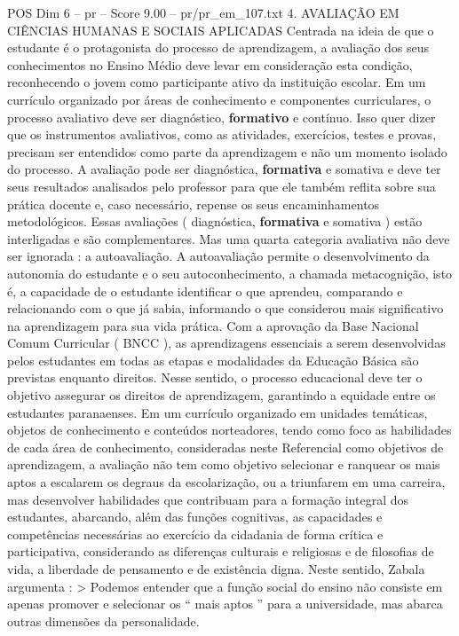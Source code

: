 \begin{textsample}{POS Dim 6 – pr – Score 9.00 – pr/pr\_em\_107.txt}  \label{ex:f6_pos_025}
4.
AVALIAÇÃO EM CIÊNCIAS HUMANAS E SOCIAIS APLICADAS Centrada na ideia de que o estudante é o protagonista do processo de aprendizagem, a avaliação dos seus conhecimentos no Ensino Médio deve levar em consideração esta condição, reconhecendo o jovem como participante ativo da instituição escolar.
Em um currículo organizado por áreas de conhecimento e componentes curriculares, o processo avaliativo deve ser diagnóstico, \textbf{formativo} e contínuo.
Isso quer dizer que os instrumentos avaliativos, como as atividades, exercícios, testes e provas, precisam ser entendidos como parte da aprendizagem e não um momento isolado do processo.
A avaliação pode ser diagnóstica, \textbf{formativa} e somativa e deve ter seus resultados analisados pelo professor para que ele também reflita sobre sua prática docente e, caso necessário, repense os seus encaminhamentos metodológicos.
Essas avaliações ( diagnóstica, \textbf{formativa} e somativa ) estão interligadas e são complementares.
Mas uma quarta categoria avaliativa não deve ser ignorada : a autoavaliação.
A autoavaliação permite o desenvolvimento da autonomia do estudante e o seu autoconhecimento, a chamada metacognição, isto é, a capacidade de o estudante identificar o que aprendeu, comparando e relacionando com o que já sabia, informando o que considerou mais significativo na aprendizagem para sua vida prática.
Com a aprovação da Base Nacional Comum Curricular ( BNCC ), as aprendizagens essenciais a serem desenvolvidas pelos estudantes em todas as etapas e modalidades da Educação Básica são previstas enquanto direitos.
Nesse sentido, o processo educacional deve ter o objetivo assegurar os direitos de aprendizagem, garantindo a equidade entre os estudantes paranaenses.
Em um currículo organizado em unidades temáticas, objetos de conhecimento e conteúdos norteadores, tendo como foco as habilidades de cada área de conhecimento, consideradas neste Referencial como objetivos de aprendizagem, a avaliação não tem como objetivo selecionar e ranquear os mais aptos a escalarem os degraus da escolarização, ou a triunfarem em uma carreira, mas desenvolver habilidades que contribuam para a formação integral dos estudantes, abarcando, além das funções cognitivas, as capacidades e competências necessárias ao exercício da cidadania de forma crítica e participativa, considerando as diferenças culturais e religiosas e de filosofias de vida, a liberdade de pensamento e de existência digna.
Neste sentido, Zabala argumenta : > Podemos entender que a função social do ensino não consiste em apenas promover e selecionar os “ mais aptos ” para a universidade, mas abarca outras dimensões da personalidade.

\end{textsample}
